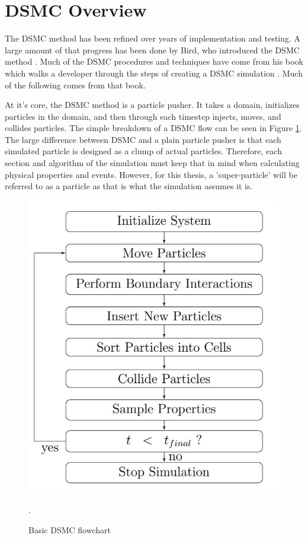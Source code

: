 \section{DSMC Overview}

The DSMC method has been refined over years of implementation and testing. A large amount of that progress has been done by Bird, who introduced the DSMC method \cite{dsmc_speed}. Much of the DSMC procedures and techniques have come from his book which walks a developer through the steps of creating a DSMC simulation \cite{bird_dsmc}. Much of the following comes from that book. \par


\indent At it's core, the DSMC method is a particle pusher. It takes a domain, initializes particles in the domain, and then through each timestep injects, moves, and collides particles. The simple breakdown of a DSMC flow can be seen in Figure \ref{fig:dsmc_flow}. The large difference between DSMC and a plain particle pusher is that each simulated particle is designed as a clump of actual particles. Therefore, each section and algorithm of the simulation must keep that in mind when calculating physical properties and events. However, for this thesis, a 'super-particle' will be referred to as a particle as that is what the simulation assumes it is. \par

\begin{figure}
    \includegraphics[width=.5\textwidth]{figures/dsmc_flow.JPG}
    \centering
    \caption{Basic DSMC flowchart \cite{Galvez2018a}}.
    \label{fig:dsmc_flow}
\end{figure}


